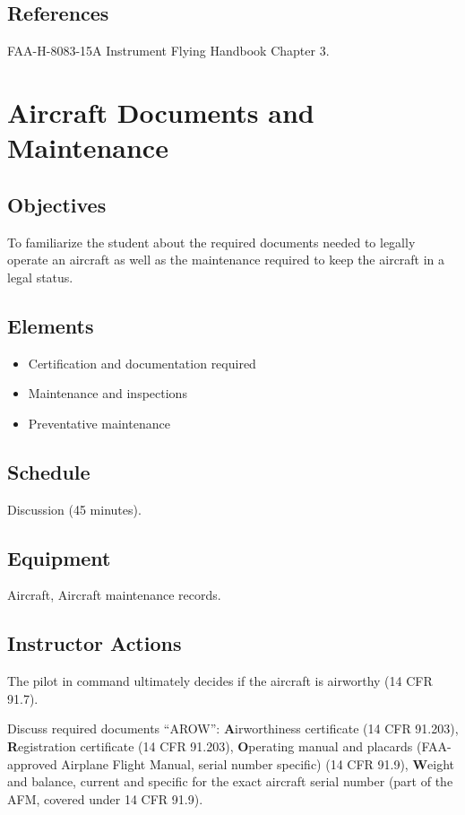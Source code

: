 \documentclass[twoside,openright]{report}
\begin{document}
\section{References}

FAA-H-8083-15A Instrument Flying Handbook Chapter 3.

\chapter{Aircraft Documents and Maintenance}

\section{Objectives}

To familiarize the student about the required documents needed to legally
operate an aircraft as well as the maintenance required to keep the aircraft in
a legal status.

\section{Elements}

\begin{itemize}
  \item Certification and documentation required
  \item Maintenance and inspections
  \item Preventative maintenance
\end{itemize}

\section{Schedule}

Discussion (45 minutes).

\section{Equipment}

Aircraft, Aircraft maintenance records.

\section{Instructor Actions}

The pilot in command ultimately decides if the aircraft is airworthy (14 CFR
91.7).

Discuss required documents ``AROW'': \textbf{A}irworthiness certificate (14 CFR
91.203), \textbf{R}egistration certificate (14 CFR 91.203), \textbf{O}perating
manual and placards (FAA-approved Airplane Flight Manual, serial number
specific) (14 CFR 91.9), \textbf{W}eight and balance, current and specific for
the exact aircraft serial number (part of the AFM, covered under 14 CFR 91.9).
\end{document}
